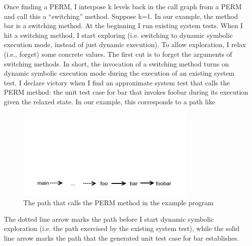 \documentclass[proposal]{umthesis} %
\begin{document}
Once finding a PERM, I interpose k levels back in the call graph from a PERM and call this a “switching” method.  Suppose k=1. In our example, the method bar is a switching method.  At the beginning I run existing system tests.  When I hit a switching method, I start exploring (i.e. switching to dynamic symbolic execution mode, instead of just dynamic execution).  To allow exploration, I relax (i.e., forget) some concrete values.  The first cut is to forget the arguments of switching methods.  In short, the invocation of a switching method turns on dynamic symbolic execution mode during the execution of an existing system test.  I declare victory when I find an approximate system test that calls the PERM method: the unit test case for bar that invokes foobar during its execution given the relaxed state.  In our example, this corresponds to a path like 

\begin{figure}[h]
\centering
\includegraphics[width=3.5in, trim=0in 0in 0in 2.0in, clip]{path.png}
\caption{The path that calls the PERM method in the example program}
\end{figure}

The dotted line arrow marks the path before I start dynamic symbolic exploration (i.e. the path exercised by the existing system test), while the solid line arrow marks the path that the generated unit test case for bar establishes. 
\end{document}
